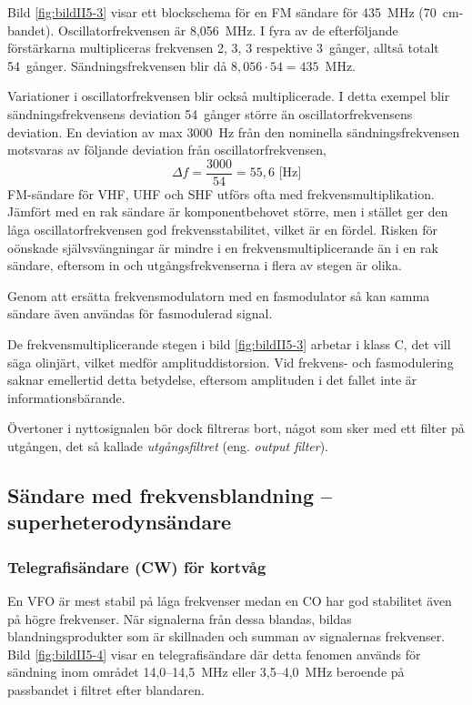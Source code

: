 Bild \ref{fig:bildII5-3} visar ett blockschema för en FM sändare för
435~MHz (70~cm-bandet).
Oscillatorfrekvensen är 8,056~MHz.
I fyra av de efterföljande förstärkarna multipliceras frekvensen 2, 3, 3
respektive 3~gånger, alltså totalt 54~gånger.
Sändningsfrekvensen blir då \(8,056 \cdot 54 = 435\)~MHz.

Variationer i oscillatorfrekvensen blir också multiplicerade.
I detta exempel blir sändningsfrekvensens deviation 54~gånger större än
oscillatorfrekvensens deviation.
En deviation av max 3000~Hz från den nominella sändningsfrekvensen motsvaras
av följande deviation från oscillatorfrekvensen,
\[\Delta f = \frac{3000}{54} = 55,6\text{ [Hz]}\]
FM-sändare för VHF, UHF och SHF utförs ofta med
frekvensmultiplikation.
Jämfört med en rak sändare är komponentbehovet större, men i stället ger
den låga oscillatorfrekvensen god frekvensstabilitet, vilket är en fördel.
Risken för oönskade självsvängningar är mindre i en frekvensmultiplicerande
än i en rak sändare, eftersom in och utgångsfrekvenserna i flera av stegen är
olika.

Genom att ersätta frekvensmodulatorn med en fasmodulator så kan samma
sändare även användas för fasmodulerad signal.

De frekvensmultiplicerande stegen i bild \ref{fig:bildII5-3} arbetar i klass C,
det vill säga olinjärt, vilket medför amplituddistorsion.
Vid frekvens- och fasmodulering saknar emellertid detta betydelse, eftersom
amplituden i det fallet inte är informationsbärande.

Övertoner i nyttosignalen bör dock filtreras bort, något som sker med ett
filter på utgången, det så kallade \emph{utgångsfiltret}
(eng. \emph{output filter}).

\subsection{Sändare med frekvensblandning -- superheterodynsändare}

\subsubsection{Telegrafisändare (CW) för kortvåg}


En VFO är mest stabil på låga frekvenser medan en CO har god
stabilitet även på högre frekvenser.
När signalerna från dessa blandas, bildas blandningsprodukter som är
skillnaden och summan av signalernas frekvenser.
Bild \ref{fig:bildII5-4} visar en telegrafisändare där detta fenomen används
för sändning inom området 14,0--14,5~MHz eller 3,5--4,0~MHz beroende
på passbandet i filtret efter blandaren.

